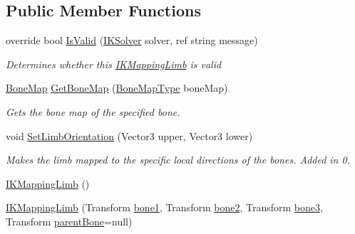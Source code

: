 \subsection*{Public Member Functions}
\begin{DoxyCompactItemize}
\item 
override bool \mbox{\hyperlink{class_root_motion_1_1_final_i_k_1_1_i_k_mapping_limb_a9c62050a36b238ef19332f8855fdb6e4}{Is\+Valid}} (\mbox{\hyperlink{class_root_motion_1_1_final_i_k_1_1_i_k_solver}{I\+K\+Solver}} solver, ref string message)
\begin{DoxyCompactList}\small\item\em Determines whether this \mbox{\hyperlink{class_root_motion_1_1_final_i_k_1_1_i_k_mapping_limb}{I\+K\+Mapping\+Limb}} is valid \end{DoxyCompactList}\item 
\mbox{\hyperlink{class_root_motion_1_1_final_i_k_1_1_i_k_mapping_1_1_bone_map}{Bone\+Map}} \mbox{\hyperlink{class_root_motion_1_1_final_i_k_1_1_i_k_mapping_limb_a72756abf29a9f7bd26c9b63a43cf022d}{Get\+Bone\+Map}} (\mbox{\hyperlink{class_root_motion_1_1_final_i_k_1_1_i_k_mapping_limb_af0c71500c2436aef8e0a11f5847efdcd}{Bone\+Map\+Type}} bone\+Map)
\begin{DoxyCompactList}\small\item\em Gets the bone map of the specified bone. \end{DoxyCompactList}\item 
void \mbox{\hyperlink{class_root_motion_1_1_final_i_k_1_1_i_k_mapping_limb_ae4f40dff54f15d6f420af0563b3ce6c9}{Set\+Limb\+Orientation}} (Vector3 upper, Vector3 lower)
\begin{DoxyCompactList}\small\item\em Makes the limb mapped to the specific local directions of the bones. Added in 0. \end{DoxyCompactList}\item 
\mbox{\hyperlink{class_root_motion_1_1_final_i_k_1_1_i_k_mapping_limb_a49d3cd70114cc2d9c93d176a444a9aba}{I\+K\+Mapping\+Limb}} ()
\item 
\mbox{\hyperlink{class_root_motion_1_1_final_i_k_1_1_i_k_mapping_limb_a6d02861599dbaefa9c3dbdc7736677cc}{I\+K\+Mapping\+Limb}} (Transform \mbox{\hyperlink{class_root_motion_1_1_final_i_k_1_1_i_k_mapping_limb_aeb108a14f3398078896309020aaeedd1}{bone1}}, Transform \mbox{\hyperlink{class_root_motion_1_1_final_i_k_1_1_i_k_mapping_limb_a2b296b91149791403d9faaef39c635dd}{bone2}}, Transform \mbox{\hyperlink{class_root_motion_1_1_final_i_k_1_1_i_k_mapping_limb_aab10d22e5556a9db8903bf53d5385181}{bone3}}, Transform \mbox{\hyperlink{class_root_motion_1_1_final_i_k_1_1_i_k_mapping_limb_af480ef05ab503917f441d275ed8c8b13}{parent\+Bone}}=null)

\end{DoxyCompactItemize}
